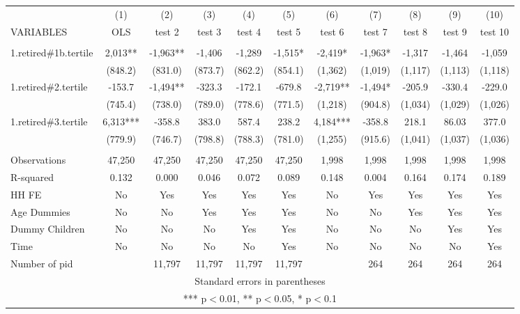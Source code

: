 \begin{tabular}{lcccccccccc} \hline
 & (1) & (2) & (3) & (4) & (5) & (6) & (7) & (8) & (9) & (10) \\
VARIABLES & OLS & test 2 & test 3 & test 4 & test 5 & test 6 & test 7 & test 8 & test 9 & test 10 \\ \hline
 &  &  &  &  &  &  &  &  &  &  \\
1.retired\#1b.tertile & 2,013** & -1,963** & -1,406 & -1,289 & -1,515* & -2,419* & -1,963* & -1,317 & -1,464 & -1,059 \\
 & (848.2) & (831.0) & (873.7) & (862.2) & (854.1) & (1,362) & (1,019) & (1,117) & (1,113) & (1,118) \\
1.retired\#2.tertile & -153.7 & -1,494** & -323.3 & -172.1 & -679.8 & -2,719** & -1,494* & -205.9 & -330.4 & -229.0 \\
 & (745.4) & (738.0) & (789.0) & (778.6) & (771.5) & (1,218) & (904.8) & (1,034) & (1,029) & (1,026) \\
1.retired\#3.tertile & 6,313*** & -358.8 & 383.0 & 587.4 & 238.2 & 4,184*** & -358.8 & 218.1 & 86.03 & 377.0 \\
 & (779.9) & (746.7) & (798.8) & (788.3) & (781.0) & (1,255) & (915.6) & (1,041) & (1,037) & (1,036) \\
 &  &  &  &  &  &  &  &  &  &  \\
Observations & 47,250 & 47,250 & 47,250 & 47,250 & 47,250 & 1,998 & 1,998 & 1,998 & 1,998 & 1,998 \\
R-squared & 0.132 & 0.000 & 0.046 & 0.072 & 0.089 & 0.148 & 0.004 & 0.164 & 0.174 & 0.189 \\
HH FE & No & Yes & Yes & Yes & Yes & No & Yes & Yes & Yes & Yes \\
Age Dummies & No & No & Yes & Yes & Yes & No & No & Yes & Yes & Yes \\
Dummy Children & No & No & No & Yes & Yes & No & No & No & Yes & Yes \\
Time & No & No & No & No & Yes & No & No & No & No & Yes \\
 Number of pid &  & 11,797 & 11,797 & 11,797 & 11,797 &  & 264 & 264 & 264 & 264 \\ \hline
\multicolumn{11}{c}{ Standard errors in parentheses} \\
\multicolumn{11}{c}{ *** p$<$0.01, ** p$<$0.05, * p$<$0.1} \\
\end{tabular}
